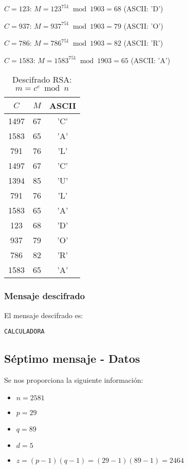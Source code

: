 $C = 123$: $M = 123^{751} \bmod 1903 = 68$ (ASCII: 'D')

$C = 937$: $M = 937^{751} \bmod 1903 = 79$ (ASCII: 'O')

$C = 786$: $M = 786^{751} \bmod 1903 = 82$ (ASCII: 'R')

$C = 1583$: $M = 1583^{751} \bmod 1903 = 65$ (ASCII: 'A')

\begin{table}[h]
\centering
\begin{tabular}{|c|c|c|}
\hline
$C$ & $M$ & ASCII \\ \hline
1497 & 67 & 'C' \\ \hline
1583 & 65 & 'A' \\ \hline
791 & 76 & 'L' \\ \hline
1497 & 67 & 'C' \\ \hline
1394 & 85 & 'U' \\ \hline
791 & 76 & 'L' \\ \hline
1583 & 65 & 'A' \\ \hline
123 & 68 & 'D' \\ \hline
937 & 79 & 'O' \\ \hline
786 & 82 & 'R' \\ \hline
1583 & 65 & 'A' \\ \hline
\end{tabular}
\caption{Descifrado RSA: $m = c^e \bmod n$}
\label{tab:descifrado}
\end{table}
\subsubsection{Mensaje descifrado}

El mensaje descifrado es:

\begin{verbatim}
CALCULADORA
\end{verbatim}






\subsection{Séptimo mensaje - Datos}

Se nos proporciona la siguiente información:

\begin{itemize}
\item $n = 2581$
\item $p = 29$
\item $q = 89$
\item $d = 5$
\item $z = (p-1)(q-1) = (29-1)(89-1) = 2464$
\end{itemize}

